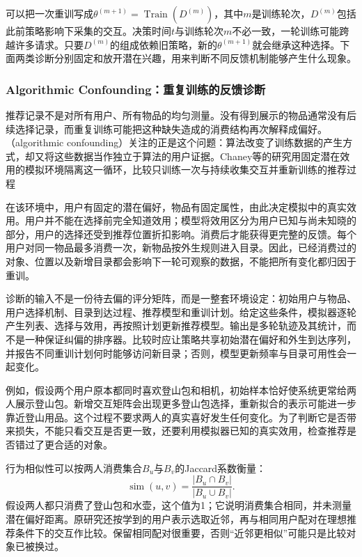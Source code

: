 可以把一次重训写成$\theta^{(m+1)}=\operatorname{Train}(D^{(m)})$，其中$m$是训练轮次，$D^{(m)}$包括此前策略影响下采集的交互。决策时间$t$与训练轮次$m$不必一致，一轮训练可能跨越许多请求。只要$D^{(m)}$的组成依赖旧策略，新的$\theta^{(m+1)}$就会继承这种选择。下面两类诊断分别固定和放开潜在兴趣，用来判断不同反馈机制能够产生什么现象。

\Needspace{100mm}
\subsubsection{Algorithmic Confounding：重复训练的反馈诊断}
\label{sec:rs-algorithmic-confounding}

推荐记录不是对所有用户、所有物品的均匀测量。没有得到展示的物品通常没有后续选择记录，而重复训练可能把这种缺失造成的消费结构再次解释成偏好。（algorithmic confounding）关注的正是这个问题：算法改变了训练数据的产生方式，却又将这些数据当作独立于算法的用户证据。Chaney等的研究用固定潜在效用的模拟环境隔离这一循环，比较只训练一次与持续收集交互并重新训练的推荐过程

在该环境中，用户有固定的潜在偏好，物品有固定属性，由此决定模拟中的真实效用。用户并不能在选择前完全知道效用；模型将效用区分为用户已知与尚未知晓的部分，用户的选择还受到推荐位置折扣影响。消费后才能获得更完整的反馈。每个用户对同一物品最多消费一次，新物品按外生规则进入目录。因此，已经消费过的对象、位置以及新增目录都会影响下一轮可观察的数据，不能把所有变化都归因于重训。

诊断的输入不是一份待去偏的评分矩阵，而是一整套环境设定：初始用户与物品、用户选择机制、目录到达过程、推荐模型和重训计划。给定这些条件，模拟器逐轮产生列表、选择与效用，再按照计划更新推荐模型。输出是多轮轨迹及其统计，而不是一种保证纠偏的排序器。比较时应让策略共享初始潜在偏好和外生到达序列，并报告不同重训计划何时能够访问新目录；否则，模型更新频率与目录可用性会一起变化。

例如，假设两个用户原本都同时喜欢登山包和相机，初始样本恰好使系统更常给两人展示登山包。新增交互矩阵会出现更多登山包选择，重新拟合的表示可能进一步靠近登山用品。这个过程不要求两人的真实喜好发生任何变化。为了判断它是否带来损失，不能只看交互是否更一致，还要利用模拟器已知的真实效用，检查推荐是否错过了更合适的对象。

行为相似性可以按两人消费集合$B_u$与$B_v$的Jaccard系数衡量：
\[
 \operatorname{sim}(u,v)
 =\frac{|B_u\cap B_v|}{|B_u\cup B_v|}.
\]
假设两人都只消费了登山包和水壶，这个值为1；它说明消费集合相同，并未测量潜在偏好距离。原研究还按学到的用户表示选取近邻，再与相同用户配对在理想推荐条件下的交互作比较。保留相同配对很重要，否则“近邻更相似”可能只是比较对象已被换过。

